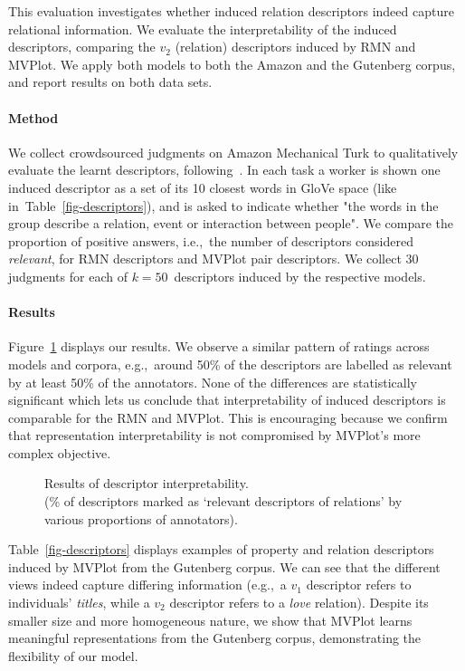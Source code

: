 \documentclass[11pt,letterpaper]{article}
\begin{document}
This evaluation investigates whether induced relation descriptors indeed capture relational information. We evaluate the interpretability of the induced descriptors, comparing the $v_2$ (relation) descriptors induced by RMN and MVPlot. We apply both models to both the Amazon and the Gutenberg corpus, and report results on both data sets.


\paragraph{Method} We collect crowdsourced judgments on Amazon Mechanical Turk%
to qualitatively evaluate the learnt descriptors, following~. 
In each task a worker is shown one induced descriptor as a set of its 10 closest words in GloVe space (like in~Table~\ref{fig-descriptors}), and is asked to indicate whether "the words in the group describe a relation, event or interaction between people". We compare the proportion of positive answers, i.e.,~the number of descriptors considered {\it relevant}, for RMN descriptors and MVPlot pair descriptors.
We collect 30 judgments for each of $k{=}50$~descriptors induced by the respective models.


\paragraph{Results} Figure~\ref{fig-mturk} displays our results. We observe a similar pattern of ratings across models and corpora, e.g.,~around 50\% of the descriptors are labelled as relevant by at least 50\% of the annotators. None of the differences are statistically significant which lets us conclude that interpretability of induced descriptors is comparable for the RMN and MVPlot. This is encouraging because we confirm that representation interpretability is not compromised by MVPlot's more complex objective.

\begin{figure}
 
 \caption{Results of descriptor interpretability. \\ (\% of descriptors marked as `relevant descriptors of relations' by various proportions of annotators).}
 \label{fig-mturk}
\end{figure}


Table~\ref{fig-descriptors} displays examples of property and relation descriptors induced by MVPlot from the Gutenberg corpus. We can see that the different views indeed capture differing information (e.g.,~a $v_1$ descriptor refers to individuals' {\it titles}, while a $v_2$ descriptor refers to a {\it love} relation). Despite its smaller size and more homogeneous nature, we show that MVPlot learns meaningful representations from the Gutenberg corpus, demonstrating the flexibility of our model. 
\end{document}
